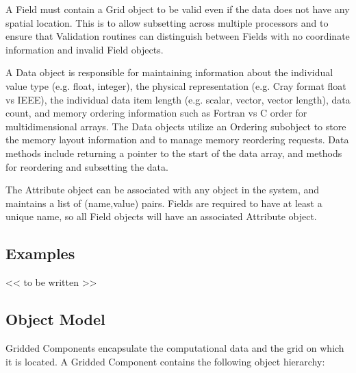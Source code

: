 A Field must contain a Grid object to be valid even if the data does not
have any spatial location.  This is to allow subsetting across multiple
processors and to ensure that Validation routines can distinguish between
Fields with no coordinate information and invalid Field objects.

A Data object is responsible for maintaining
information about the individual value type (e.g. float, integer), 
the physical representation (e.g. Cray format float vs IEEE), the 
individual data item length (e.g. scalar, vector, vector length), 
data count, and memory ordering information such as Fortran vs C order 
for multidimensional arrays.  
The Data objects utilize an Ordering subobject to store the
memory layout information and to manage memory reordering requests.
Data methods include returning a pointer to the start of the data
array, and methods for reordering and subsetting the data.

The Attribute object can be associated with any object in the system,
and maintains a list of (name,value) pairs.  Fields are required to
have at least a unique name, so all Field objects will have an associated
Attribute object.


\subsection{Examples}

<< to be written >>

\subsection{Object Model}

Gridded Components encapsulate the computational data and the
grid on which it is located.  A Gridded Component contains
the following object hierarchy:

